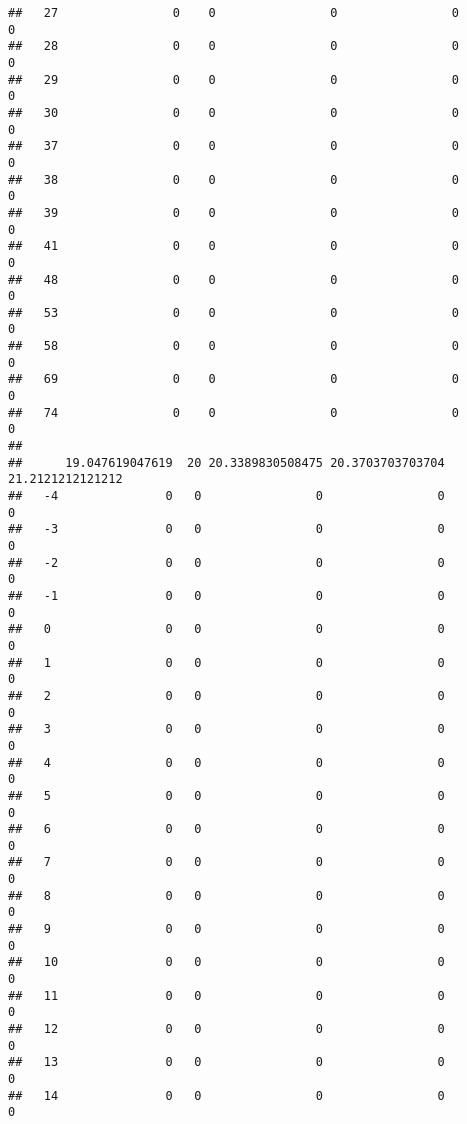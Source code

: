 \documentclass[]{article}
\begin{document}
\begin{verbatim}
##   27                0    0                0                0                0
##   28                0    0                0                0                0
##   29                0    0                0                0                0
##   30                0    0                0                0                0
##   37                0    0                0                0                0
##   38                0    0                0                0                0
##   39                0    0                0                0                0
##   41                0    0                0                0                0
##   48                0    0                0                0                0
##   53                0    0                0                0                0
##   58                0    0                0                0                0
##   69                0    0                0                0                0
##   74                0    0                0                0                0
##     
##      19.047619047619  20 20.3389830508475 20.3703703703704 21.2121212121212
##   -4               0   0                0                0                0
##   -3               0   0                0                0                0
##   -2               0   0                0                0                0
##   -1               0   0                0                0                0
##   0                0   0                0                0                0
##   1                0   0                0                0                0
##   2                0   0                0                0                0
##   3                0   0                0                0                0
##   4                0   0                0                0                0
##   5                0   0                0                0                0
##   6                0   0                0                0                0
##   7                0   0                0                0                0
##   8                0   0                0                0                0
##   9                0   0                0                0                0
##   10               0   0                0                0                0
##   11               0   0                0                0                0
##   12               0   0                0                0                0
##   13               0   0                0                0                0
##   14               0   0                0                0                0

\end{verbatim}
\end{document}
